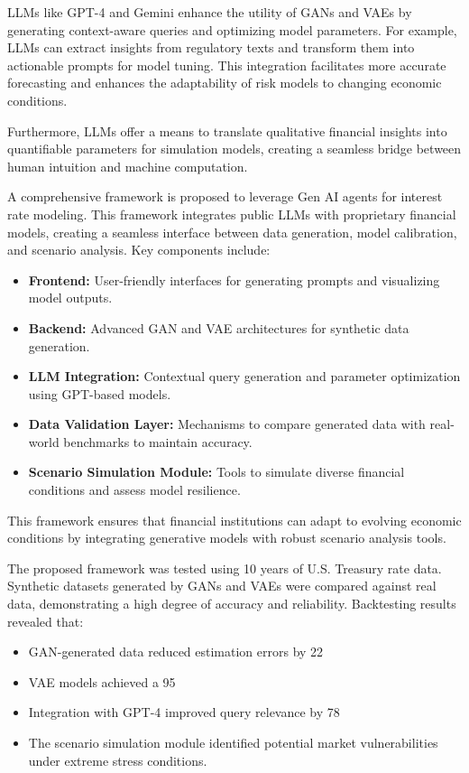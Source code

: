 \documentclass[a4paper,12pt]{scrbook}
\begin{document}
	LLMs like GPT-4 and Gemini enhance the utility of GANs and VAEs by generating context-aware queries and optimizing model parameters. For example, LLMs can extract insights from regulatory texts and transform them into actionable prompts for model tuning. This integration facilitates more accurate forecasting and enhances the adaptability of risk models to changing economic conditions.
	
	Furthermore, LLMs offer a means to translate qualitative financial insights into quantifiable parameters for simulation models, creating a seamless bridge between human intuition and machine computation.
	
	
	A comprehensive framework is proposed to leverage Gen AI agents for interest rate modeling. This framework integrates public LLMs with proprietary financial models, creating a seamless interface between data generation, model calibration, and scenario analysis. Key components include:
	
	\begin{itemize}
		\item \textbf{Frontend:} User-friendly interfaces for generating prompts and visualizing model outputs.
		\item \textbf{Backend:} Advanced GAN and VAE architectures for synthetic data generation.
		\item \textbf{LLM Integration:} Contextual query generation and parameter optimization using GPT-based models.
		\item \textbf{Data Validation Layer:} Mechanisms to compare generated data with real-world benchmarks to maintain accuracy.
		\item \textbf{Scenario Simulation Module:} Tools to simulate diverse financial conditions and assess model resilience.
	\end{itemize}
	
	This framework ensures that financial institutions can adapt to evolving economic conditions by integrating generative models with robust scenario analysis tools.
	
	
	The proposed framework was tested using 10 years of U.S. Treasury rate data. Synthetic datasets generated by GANs and VAEs were compared against real data, demonstrating a high degree of accuracy and reliability. Backtesting results revealed that:
	
	\begin{itemize}
		\item GAN-generated data reduced estimation errors by 22%
		\item VAE models achieved a 95%
		\item Integration with GPT-4 improved query relevance by 78%
		\item The scenario simulation module identified potential market vulnerabilities under extreme stress conditions.
	\end{itemize}
	
\end{document}
